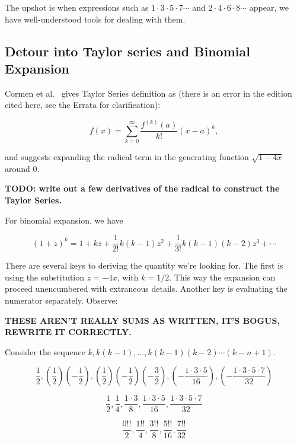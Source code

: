 \documentclass{article}
\begin{document}
The upshot is when expressions such as $1\cdot3\cdot5\cdot7\cdots$ and
$2\cdot4\cdot6\cdot8\cdots$ appear, we have well-understood tools for dealing
with them.

\subsection{Detour into Taylor series and Binomial Expansion}

Cormen et al.~\cite[p. 262]{cormen:th:1990} gives Taylor Series definition as
(there is an error in the edition cited here, see the Errata for clarification):

\begin{equation}
f(x) = \sum_{k=0}^{\infty} \frac{f^{(k)}(a)}{k!}(x-a)^k,
\end{equation}

and suggests expanding the radical term in the generating function
$\sqrt{1-4x}$ around $0$.

{\bf TODO: write out a few derivatives of the radical to construct
the Taylor Series.}

For binomial expansion, we have

\begin{equation}
  (1 + z)^k = 1 + kz + \frac{1}{2!}k(k - 1)z^2 + \frac{1}{3!}k(k - 1)(k - 2)z^3 + \cdots
\end{equation}

There are several keys to deriving the quantity we're looking for.
The first is using the substitution $z = -4x$, with $k = 1/2$. This way the expansion
can proceed unencumbered with extraneous details. Another key is evaluating the
numerator separately. Observe:

\textbf{THESE AREN'T REALLY SUMS AS WRITTEN, IT'S BOGUS, REWRITE IT CORRECTLY.}

Consider the sequence $k, k(k-1),\dots, k(k - 1)(k - 2)\cdots(k - n + 1)$.

\begin{equation}
  \frac{1}{2},
  \left(\frac{1}{2}\right)\left(-\frac{1}{2}\right),
  \left(\frac{1}{2}\right)\left(-\frac{1}{2}\right)\left(-\frac{3}{2}\right),
  \left(-\frac{1\cdot3\cdot5}{16}\right),
  \left(-\frac{1\cdot3\cdot5\cdot7}{32}\right)
\end{equation}

\begin{equation}
  \frac{1}{2},
  \frac{1}{4},
  \frac{1\cdot3}{8},
  \frac{1\cdot3\cdot5}{16},
  \frac{1\cdot3\cdot5\cdot7}{32}
\end{equation}

\begin{equation}
  \frac{0!!}{2},
  \frac{1!!}{4},
  \frac{3!!}{8},
  \frac{5!!}{16},
  \frac{7!!}{32}
\end{equation}




{}

\end{document}
